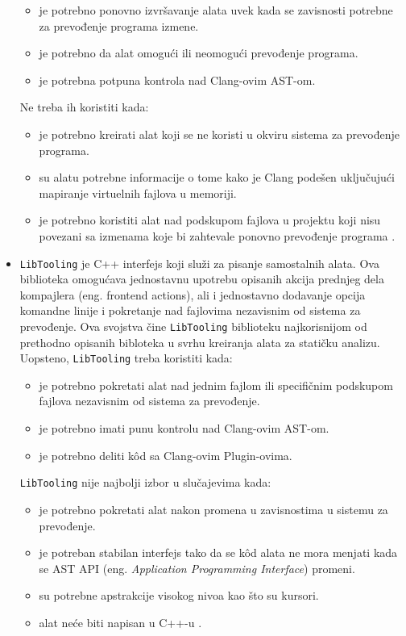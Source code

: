 \documentclass[12pt,oneside]{memoir}
\begin{document}
\begin{itemize}
\begin{itemize}
\item je potrebno ponovno izvr\v{s}avanje alata uvek kada se zavisnosti potrebne za prevođenje programa izmene.
\item je potrebno da alat omogu\'{c}i ili neomogu\'{c}i prevođenje programa.
\item je potrebna potpuna kontrola nad Clang-ovim AST-om.
\end{itemize}
Ne treba ih koristiti kada:
\begin{itemize}
\item je potrebno kreirati alat koji se ne koristi u okviru sistema za prevođenje programa.
\item su alatu potrebne informacije o tome kako je Clang pode\v{s}en uklju\v{c}uju\'{c}i mapiranje virtuelnih fajlova u memoriji.
\item je potrebno koristiti alat nad podskupom fajlova u projektu koji nisu povezani sa izmenama koje bi zahtevale ponovno prevođenje programa \cite{RightInterface}.
\end{itemize}

\item \lstinline{LibTooling} je C++ interfejs koji slu\v{z}i za pisanje samostalnih alata. Ova biblioteka omogu\'{c}ava jednostavnu
upotrebu opisanih akcija prednjeg dela kompajlera (eng. frontend actions), ali i jednostavno dodavanje opcija komandne linije i pokretanje nad fajlovima 
nezavisnim od sistema za prevođenje. Ova svojstva \v{c}ine \lstinline{LibTooling} biblioteku najkorisnijom od prethodno opisanih bibloteka u svrhu kreiranja alata za stati\v{c}ku analizu.
Uopsteno, \lstinline{LibTooling} treba koristiti kada:
\begin{itemize}
  \item je potrebno pokretati alat nad jednim fajlom ili specifi\v{c}nim podskupom fajlova nezavisnim od sistema za prevođenje.
  \item je potrebno imati punu kontrolu nad Clang-ovim AST-om.
  \item je potrebno deliti k\^{o}d  sa Clang-ovim Plugin-ovima.
\end{itemize}
\lstinline{LibTooling} nije najbolji izbor u slu\v{c}ajevima kada:
\begin{itemize}
  \item je potrebno pokretati alat nakon promena u zavisnostima u sistemu za prevođenje.
  \item je potreban stabilan interfejs tako da se k\^{o}d  alata ne mora menjati kada se AST API (eng. \textit{Application Programming Interface}) promeni.
  \item su potrebne apstrakcije visokog nivoa kao \v{s}to su kursori.
  \item alat ne\'{c}e biti napisan u C++-u \cite{RightInterface}.
\end{itemize}
\end{itemize}
\end{document}
